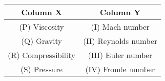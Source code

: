 \begin{center}
\begin{tabular}{|c|c|}
\hline
\textbf{Column X} & \textbf{Column Y} \\
\hline
(P) Viscosity & (I) Mach number \\
(Q) Gravity & (II) Reynolds number \\
(R) Compressibility & (III) Euler number \\
(S) Pressure & (IV) Froude number \\
\hline
\end{tabular}
\end{center}

